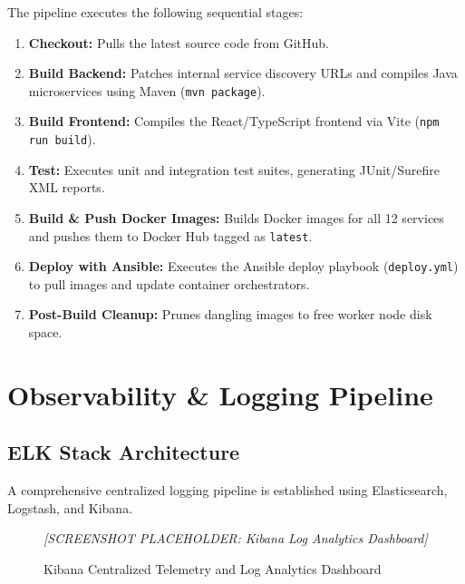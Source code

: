 \documentclass[12pt,a4paper]{report}
\begin{document}
The pipeline executes the following sequential stages:
\begin{enumerate}[leftmargin=1.5em, noitemsep]
  \item \textbf{Checkout:} Pulls the latest source code from GitHub.
  \item \textbf{Build Backend:} Patches internal service discovery URLs and compiles Java microservices using Maven (\texttt{mvn package}).
  \item \textbf{Build Frontend:} Compiles the React/TypeScript frontend via Vite (\texttt{npm run build}).
  \item \textbf{Test:} Executes unit and integration test suites, generating JUnit/Surefire XML reports.
  \item \textbf{Build \& Push Docker Images:} Builds Docker images for all 12 services and pushes them to Docker Hub tagged as \texttt{latest}.
  \item \textbf{Deploy with Ansible:} Executes the Ansible deploy playbook (\texttt{deploy.yml}) to pull images and update container orchestrators.
  \item \textbf{Post-Build Cleanup:} Prunes dangling images to free worker node disk space.
\end{enumerate}

\chapter{Observability \& Logging Pipeline}

\section{ELK Stack Architecture}

A comprehensive centralized logging pipeline is established using Elasticsearch, Logstash, and Kibana. 

\begin{figure}[H]
  \centering
  \begin{tcolorbox}[enhanced, colback=gray!10, colframe=gray!50, width=0.9\linewidth,
      height=6cm, arc=6pt, valign=center, halign=center]
    \textcolor{gray!70}{\large\textit{[SCREENSHOT PLACEHOLDER: Kibana Log Analytics Dashboard]}}
  \end{tcolorbox}
  \caption{Kibana Centralized Telemetry and Log Analytics Dashboard}
\end{figure}
\end{document}
